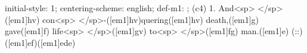 initial-style: 1;
centering-scheme: english;
def-m1: \grealign;
(c4) 1. And<sp> </sp>([em1]hv) con<sp> </sp>-([em1]hv)quering([em1]hv) death,([em1]g) gave([em1]f) life<sp> </sp>([em1]gv) to<sp> </sp>([em1]fg) man.([em1]e) (::) ([em1]ef)([em1]ede)